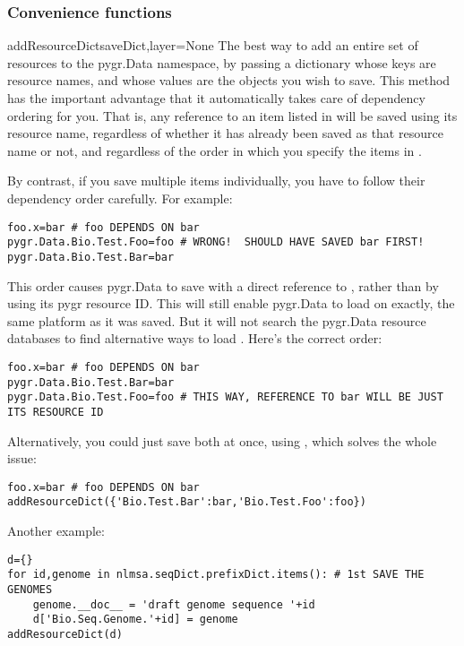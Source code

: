 \documentclass{howto}
\begin{document}
\subsubsection{Convenience functions}
\begin{funcdesc}{addResourceDict}{saveDict,layer=None}
  The best way to add an entire set of resources to the pygr.Data namespace,
  by passing a dictionary whose keys are resource names, and whose values are
  the objects you wish to save.  This method has the important advantage
  that it automatically takes care of dependency ordering for you.
  That is, any reference to an item listed in  will be
  saved using its resource name, regardless of whether it has already
  been saved as that resource name or not, and regardless of the
  order in which you specify the items in .

  By contrast, if you save multiple items individually, you have to
  follow their dependency order carefully.  For example:
\begin{verbatim}
foo.x=bar # foo DEPENDS ON bar
pygr.Data.Bio.Test.Foo=foo # WRONG!  SHOULD HAVE SAVED bar FIRST!
pygr.Data.Bio.Test.Bar=bar
\end{verbatim}
This order causes pygr.Data to save  with a direct reference
to , rather than by using its pygr resource ID.  This will still
enable pygr.Data to load  on exactly, the same platform as it
was saved.  But it will not search the pygr.Data resource databases to find
alternative ways to load .  Here's the correct order:
\begin{verbatim}
foo.x=bar # foo DEPENDS ON bar
pygr.Data.Bio.Test.Bar=bar
pygr.Data.Bio.Test.Foo=foo # THIS WAY, REFERENCE TO bar WILL BE JUST ITS RESOURCE ID
\end{verbatim}
Alternatively, you could just save both at once, using ,
which solves the whole issue:
\begin{verbatim}
foo.x=bar # foo DEPENDS ON bar
addResourceDict({'Bio.Test.Bar':bar,'Bio.Test.Foo':foo})
\end{verbatim}
  Another example:
\begin{verbatim}
d={}
for id,genome in nlmsa.seqDict.prefixDict.items(): # 1st SAVE THE GENOMES
    genome.__doc__ = 'draft genome sequence '+id
    d['Bio.Seq.Genome.'+id] = genome 
addResourceDict(d)
\end{verbatim}
\end{funcdesc}
\end{document}
